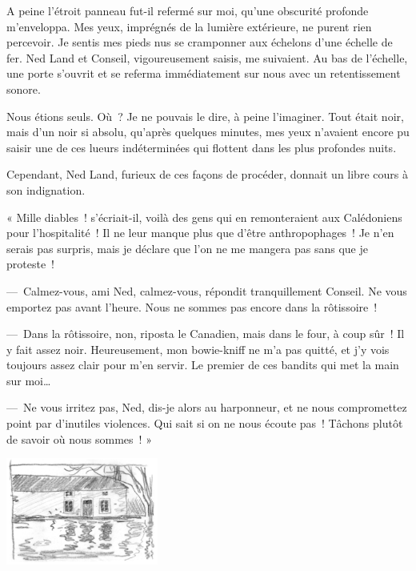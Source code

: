 \documentclass[petitlivre]{livrelitt}
\begin{document}
A peine l’étroit panneau fut-il refermé sur moi, qu’une obscurité profonde m’enveloppa. Mes yeux, imprégnés de la lumière extérieure, ne purent rien percevoir. Je sentis mes pieds nus se cramponner aux échelons d’une échelle de fer. Ned Land et Conseil, vigoureusement saisis, me suivaient. Au bas de l’échelle, une porte s’ouvrit et se referma immédiatement sur nous avec un retentissement sonore.

Nous étions seuls. Où ? Je ne pouvais le dire, à peine l’imaginer. Tout était noir, mais d’un noir si absolu, qu’après quelques minutes, mes yeux n’avaient encore pu saisir une de ces lueurs indéterminées qui flottent dans les plus profondes nuits.

Cependant, Ned Land, furieux de ces façons de procéder, donnait un libre cours à son indignation.

« Mille diables ! s’écriait-il, voilà des gens qui en remonteraient aux Calédoniens pour l’hospitalité ! Il ne leur manque plus que d’être anthropophages ! Je n’en serais pas surpris, mais je déclare que l’on ne me mangera pas sans que je proteste !

— Calmez-vous, ami Ned, calmez-vous, répondit tranquillement Conseil. Ne vous emportez pas avant l’heure. Nous ne sommes pas encore dans la rôtissoire !

— Dans la rôtissoire, non, riposta le Canadien, mais dans le four, à coup sûr ! Il y fait assez noir. Heureusement, mon bowie-kniff ne m’a pas quitté, et j’y vois toujours assez clair pour m’en servir. Le premier de ces bandits qui met la main sur moi…

— Ne vous irritez pas, Ned, dis-je alors au harponneur, et ne nous compromettez point par d’inutiles violences. Qui sait si on ne nous écoute pas ! Tâchons plutôt de savoir où nous sommes ! »

\includegraphics[width=5cm]{maison-etang.jpg}

\tableofcontents
\end{document}

